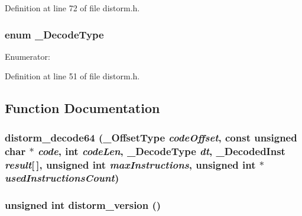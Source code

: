 Definition at line 72 of file distorm.h.
\subsubsection[{\_\-DecodeType}]{\setlength{\rightskip}{0pt plus 5cm}enum {\bf \_\-DecodeType}}\label{distorm_8h_93c9e358f502f628b9216e3331647b57}


\begin{Desc}
\item[Enumerator: ]\par
\begin{description}
\item[{\em 
Decode16Bits\label{distorm_8h_93c9e358f502f628b9216e3331647b5716660e8d515bbce843c98dc8a85a46c2}
}]\item[{\em 
Decode32Bits\label{distorm_8h_93c9e358f502f628b9216e3331647b57edd76d676fcc7e792b2d41410b8ea0f6}
}]\item[{\em 
Decode64Bits\label{distorm_8h_93c9e358f502f628b9216e3331647b576af0ecb4dfbfb31c661fb39c99b70d73}
}]\end{description}
\end{Desc}



Definition at line 51 of file distorm.h.

\subsection{Function Documentation}
\subsubsection[{distorm\_\-decode64}]{ distorm\_\-decode64 ({\bf \_\-OffsetType} {\em codeOffset}, \/  const unsigned char $\ast$ {\em code}, \/  int {\em codeLen}, \/  {\bf \_\-DecodeType} {\em dt}, \/  {\bf \_\-DecodedInst} {\em result}[$\,$], \/  unsigned int {\em maxInstructions}, \/  unsigned int $\ast$ {\em usedInstructionsCount})}\label{distorm_8h_838b7e26526231f1f8b8c09bdd29d7b2}


\subsubsection[{distorm\_\-version}]{\setlength{\rightskip}{0pt plus 5cm}unsigned int distorm\_\-version ()}\label{distorm_8h_f8d26966ba41e03f19997b4bea5484a8}


